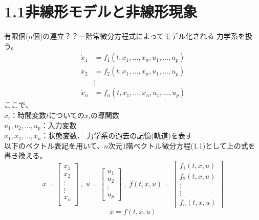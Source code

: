 \documentclass{jsarticle}
\begin{document}
\section*{1.1非線形モデルと非線形現象}
    有限個($n$個)の連立？？一階常微分方程式によってモデル化される
    力学系を扱う。
    \begin{align*}
        \dot x_1 &= f_1(t,x_1,\dots,x_n,u_1,\dots,u_p) \\
        \dot x_2 &= f_2(t,x_1,\dots,x_n,u_1,\dots,u_p) \\
        & \vdots\\
        \dot x_n &= f_n(t,x_1,\dots,x_n,u_1,\dots,u_p) 
    \end{align*}
    ここで、\\
    $\dot x_i$：時間変数$t$についての$x_i$の導関数\\
    $u_1,u_2,\dots, u_p$：入力変数\\
    $x_1,x_2,\dots,x_n$：状態変数、
    力学系の過去の記憶(軌道)を表す\\
    以下のベクトル表記を用いて、$n$次元1階ベクトル微分方程(1.1)として上の式を書き換える。
    \begin{equation*}
        x = \left[
        \begin{matrix}
            x_1 \\ x_2 \\ \vdots \\ \vdots \\ x_n \\
        \end{matrix}    
        \right]\;,\;
        u = \left[
        \begin{matrix}
            u_1 \\ u_2 \\ \vdots \\ u_p
        \end{matrix}    
        \right]\;,\;
        f(t,x,u) = \left[
        \begin{matrix}
            f_1(t,x,u) \\ f_2(t,x,u) \\ \vdots \\ \vdots \\ f_n(t,x,u)
        \end{matrix} 
        \right]
    \end{equation*}
    \begin{equation}
        \dot x = f(t,x,u) \tag{1.1}
    \end{equation}
\end{document}
